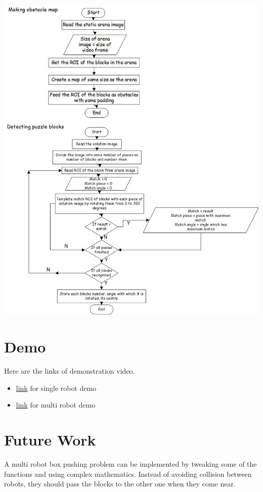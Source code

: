 \documentclass[a4paper,12pt,oneside]{book}
\begin{document}
\begin{center}
\includegraphics[scale=0.7]{obstacle.jpg}
\end{center}
\section{Demo}
Here are the links of demonstration video.
\begin{itemize}
\item \href{https://youtu.be/_RwL_YZDmpI}{link} for single robot demo
\item \href{https://youtu.be/jv9p9h0FJP0}{link} for multi robot demo
\end{itemize} 

\section{Future Work}
A multi robot box pushing problem can be implemented by tweaking some of the functions and using complex mathematics. Instead of avoiding collision between robots, they should pass the blocks to the other one when they come near.
\end{document}
